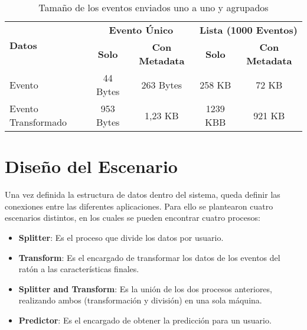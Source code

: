 \begin{table}[htbp!]
    \centering
    \begin{tabular}{ l  c  c  c  c }
        \toprule
        \multirow{2}{*}{\textbf{Datos}} & \multicolumn{2}{c}{\textbf{Evento Único}} & \multicolumn{2}{c}{\textbf{Lista (1000 Eventos)}}                                         \\ \cline{2-5}
                                        & \textbf{Solo}                             & \textbf{Con Metadata}                             & \textbf{Solo} & \textbf{Con Metadata} \\
        \midrule  \midrule
        Evento                          & 44 Bytes                                  & 263 Bytes                                         & 258 KB        & 72 KB                 \\
        \midrule
        Evento Transformado             & 953 Bytes                                 & 1,23 KB                                           & 1239 KBB       & 921 KB                \\
        \bottomrule
    \end{tabular}
    \caption{Tamaño de los eventos enviados uno a uno y agrupados}
    \label{tab:events_size}
\end{table}


\section{Diseño del Escenario}

Una vez definida la estructura de datos dentro del sistema, queda definir las conexiones entre las diferentes aplicaciones. Para ello se plantearon cuatro escenarios distintos, en los cuales se pueden encontrar cuatro procesos:

\begin{itemize}[noitemsep]
    \item \textbf{Splitter}: Es el proceso que divide los datos por usuario.
    \item \textbf{Transform}: Es el encargado de transformar los datos de los eventos del ratón a las características finales.
    \item \textbf{Splitter and Transform}: Es la unión de los dos procesos anteriores, realizando ambos (transformación y división) en una sola máquina.
    \item \textbf{Predictor}: Es el encargado de obtener la predicción para un usuario.
\end{itemize}

